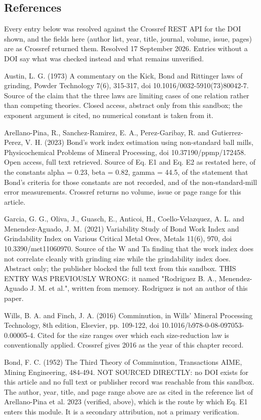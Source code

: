 \documentclass[10pt,a4paper,twoside]{report}
\begin{document}
\subsection*{References}

Every entry below was resolved against the Crossref REST API for the DOI shown, and the fields here (author list, year, title, journal, volume, issue, pages) are as Crossref returned them. Resolved 17 September 2026. Entries without a DOI say what was checked instead and what remains unverified.

Austin, L. G. (1973) A commentary on the Kick, Bond and Rittinger laws of grinding, Powder Technology 7(6), 315-317, doi 10.1016/0032-5910(73)80042-7. Source of the claim that the three laws are limiting cases of one relation rather than competing theories. Closed access, abstract only from this sandbox; the exponent argument is cited, no numerical constant is taken from it.

Arellano-Pina, R., Sanchez-Ramirez, E. A., Perez-Garibay, R. and Gutierrez-Perez, V. H. (2023) Bond's work index estimation using non-standard ball mills, Physicochemical Problems of Mineral Processing, doi 10.37190/ppmp/172458. Open access, full text retrieved. Source of Eq. E1 and Eq. E2 as restated here, of the constants alpha = 0.23, beta = 0.82, gamma = 44.5, of the statement that Bond's criteria for those constants are not recorded, and of the non-standard-mill error measurements. Crossref returns no volume, issue or page range for this article.

Garcia, G. G., Oliva, J., Guasch, E., Anticoi, H., Coello-Velazquez, A. L. and Menendez-Aguado, J. M. (2021) Variability Study of Bond Work Index and Grindability Index on Various Critical Metal Ores, Metals 11(6), 970, doi 10.3390/met11060970. Source of the W and Ta finding that the work index does not correlate cleanly with grinding size while the grindability index does. Abstract only; the publisher blocked the full text from this sandbox. THIS ENTRY WAS PREVIOUSLY WRONG: it named "Rodriguez B. A., Menendez-Aguado J. M. et al.", written from memory. Rodriguez is not an author of this paper.

Wills, B. A. and Finch, J. A. (2016) Comminution, in Wills' Mineral Processing Technology, 8th edition, Elsevier, pp. 109-122, doi 10.1016/b978-0-08-097053-0.00005-4. Cited for the size ranges over which each size-reduction law is conventionally applied. Crossref gives 2016 as the year of this chapter record.

Bond, F. C. (1952) The Third Theory of Comminution, Transactions AIME, Mining Engineering, 484-494. NOT SOURCED DIRECTLY: no DOI exists for this article and no full text or publisher record was reachable from this sandbox. The author, year, title, and page range above are as cited in the reference list of Arellano-Pina et al. 2023 (verified, above), which is the route by which Eq. E1 enters this module. It is a secondary attribution, not a primary verification.
\end{document}
